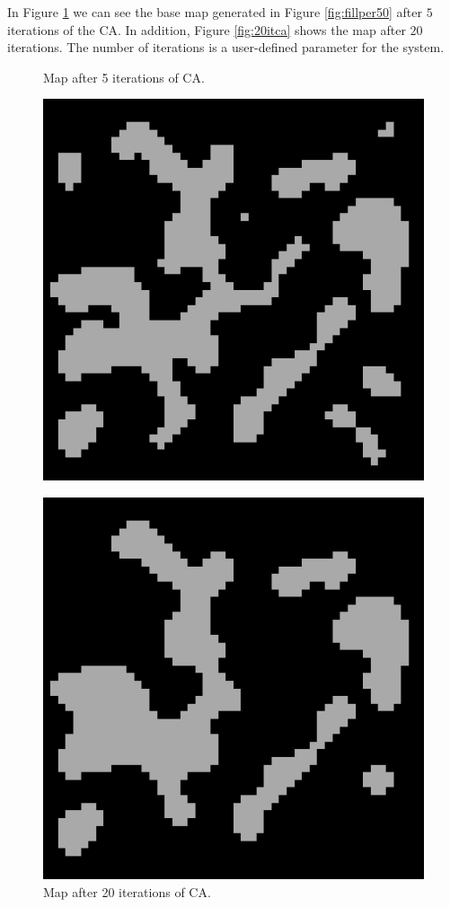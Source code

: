 In Figure \ref{fig:5itca} we can see the base map generated in Figure \ref{fig:fillper50} after \(5\) iterations of the CA. In addition, Figure \ref{fig:20itca} shows the map after \(20\) iterations. The number of iterations is a user-defined parameter for the system.

\begin{figure}[h]
  \centering
  \begin{minipage}[b]{0.4\textwidth}
    \caption{Map after 5 iterations of CA.}
    \includegraphics[width=\textwidth]{images/development/5it_ca.png}
    \label{fig:5itca}
  \end{minipage}
  \hfill
  \begin{minipage}[b]{0.4\textwidth}
    \caption{Map after 20 iterations of CA.}
    \includegraphics[width=\textwidth]{images/development/20it_ca.png}

\end{minipage}
\end{figure}
